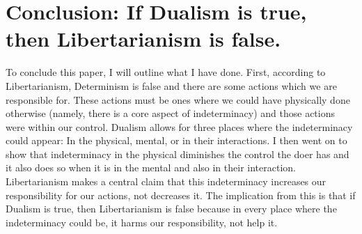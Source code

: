 \section{Conclusion: If Dualism is true, then Libertarianism is false.}
To conclude this paper, I will outline what I have done. First, according to Libertarianism, Determinism is false and there are some actions which we are responsible for. These actions must be ones where we could have physically done otherwise (namely, there is a core aspect of indeterminacy) and those actions were within our control. Dualism allows for three places where the indeterminacy could appear: In the physical, mental, or in their interactions. I then went on to show that indeterminacy in the physical diminishes the control the doer has and it also does so when it is in the mental and also in their interaction. Libertarianism makes a central claim that this indeterminacy increases our responsibility for our actions, not decreases it. The implication from this is that if Dualism is true, then Libertarianism is false because in every place where the indeterminacy could be, it harms our responsibility, not help it.
